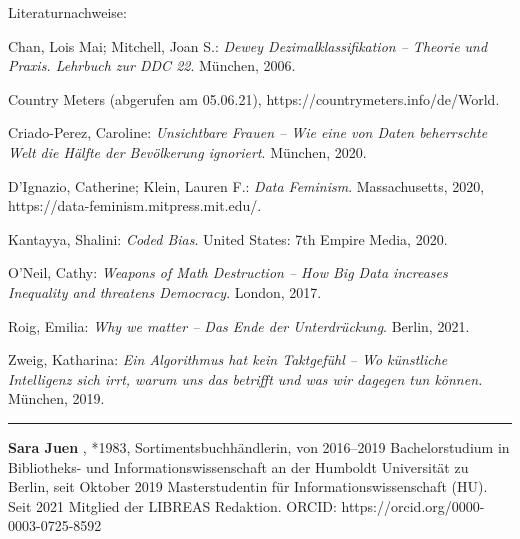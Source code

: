 \documentclass[a4paper,
fontsize=11pt,
oneside,
numbers=noperiodatend,
parskip=half-,
bibliography=totoc,
final
]{scrartcl}
\begin{document}
Literaturnachweise:

Chan, Lois Mai; Mitchell, Joan S.: \emph{Dewey Dezimalklassifikation --
Theorie und Praxis. Lehrbuch zur DDC 22}. München, 2006.

Country Meters (abgerufen am 05.06.21),
https://countrymeters.info/de/World.

Criado-Perez, Caroline: \emph{Unsichtbare Frauen -- Wie eine von Daten
beherrschte Welt die Hälfte der Bevölkerung ignoriert}. München, 2020.

D'Ignazio, Catherine; Klein, Lauren F.: \emph{Data Feminism}.
Massachusetts, 2020, \linebreak https://data-feminism.mitpress.mit.edu/.

Kantayya, Shalini: \emph{Coded Bias}. United States: 7th Empire Media,
2020.

O'Neil, Cathy: \emph{Weapons of Math Destruction -- How Big Data
increases Inequality and threatens Democracy}. London, 2017.

Roig, Emilia: \emph{Why we matter -- Das Ende der Unterdrückung}.
Berlin, 2021.

Zweig, Katharina: \emph{Ein Algorithmus hat kein Taktgefühl -- Wo
künstliche Intelligenz sich irrt, warum uns das betrifft und was wir
dagegen tun können.} München, 2019.

\begin{center}\rule{0.5\linewidth}{0.5pt}\end{center}

\textbf{Sara Juen} , *1983, Sortimentsbuchhändlerin, von 2016--2019
Bachelorstudium in Bibliotheks- und Informationswissenschaft an der
Humboldt Universität zu Berlin, seit Oktober 2019 Masterstudentin für
Informationswissenschaft (HU). Seit 2021 Mitglied der LIBREAS Redaktion.
ORCID: https://orcid.org/0000-0003-0725-8592
\end{document}
